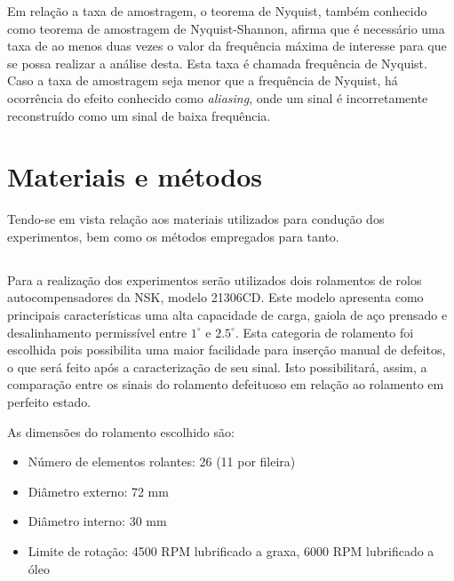 \documentclass[
	12pt,				
	oneside,			
	a4paper,			
	english,			
	brazil,			
	]{abntex2ppgsi}
\begin{document}
Em relação a taxa de amostragem, o teorema de Nyquist, também conhecido como teorema de amostragem de Nyquist-Shannon, afirma que é necessário uma taxa de ao menos duas vezes o valor da frequência máxima de interesse para que se possa realizar a análise desta. Esta taxa é chamada frequência de Nyquist. Caso a taxa de amostragem seja menor que a frequência de Nyquist, há ocorrência do efeito conhecido como \textit{aliasing}, onde um sinal é incorretamente reconstruído como um sinal de baixa frequência.



\subsection{}



\chapter{Materiais e métodos}


Tendo-se em vista relação aos materiais utilizados para condução dos experimentos, bem como os métodos empregados para tanto.

\section{}

Para a realização dos experimentos serão utilizados dois rolamentos de rolos autocompensadores da NSK, modelo 21306CD. Este modelo apresenta como principais características uma alta capacidade de carga, gaiola de aço prensado e desalinhamento permissível entre $1^{\circ}$ e $2.5^{\circ}$. Esta categoria de rolamento foi escolhida pois possibilita uma maior facilidade para inserção manual de defeitos, o que será feito após a caracterização de seu sinal. Isto possibilitará, assim, a comparação entre os sinais do rolamento defeituoso em relação ao rolamento em perfeito estado. 

As dimensões do rolamento escolhido são:

\begin{itemize}
	\item Número de elementos rolantes: 26 (11 por fileira)
	\item Diâmetro externo: 72 \si{\mm}
	\item Diâmetro interno: 30 \si{\mm}
	\item Limite de rotação: 4500 RPM lubrificado a graxa, 6000 RPM lubrificado a óleo
\end{itemize}
\end{document}
